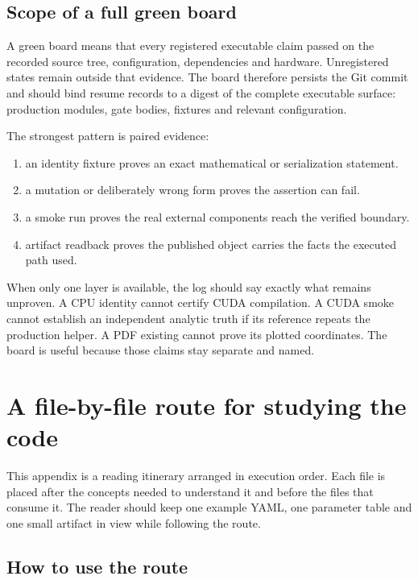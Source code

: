 \documentclass[10pt,aps,prd,twocolumn,nofootinbib]{revtex4-2}
\begin{document}
\subsection{Scope of a full green board}

A green board means that every registered executable claim passed on the
recorded source tree, configuration, dependencies and hardware.  Unregistered
states remain outside that evidence.  The board therefore persists the
Git commit and should bind resume records to a digest of the complete
executable surface: production modules, gate bodies, fixtures and relevant
configuration.

The strongest pattern is paired evidence:
\begin{enumerate}
  \item an identity fixture proves an exact mathematical or serialization
        statement.
  \item a mutation or deliberately wrong form proves the assertion can fail.
  \item a smoke run proves the real external components reach the verified
        boundary.
  \item artifact readback proves the published object carries the facts the
        executed path used.
\end{enumerate}
When only one layer is available, the log should say exactly what remains
unproven.  A CPU identity cannot certify CUDA compilation.  A CUDA smoke
cannot establish an independent analytic truth if its reference repeats the
production helper.  A PDF existing cannot prove its plotted coordinates.
The board is useful because those claims stay separate and named.

\section{A file-by-file route for studying the code}
\label{app:study-route}

This appendix is a reading itinerary arranged in execution order.  Each file
is placed after the concepts needed to understand it and before the files that
consume it.  The reader should keep one example YAML, one parameter table and
one small artifact in view while following the route.

\subsection{How to use the route}
\end{document}

